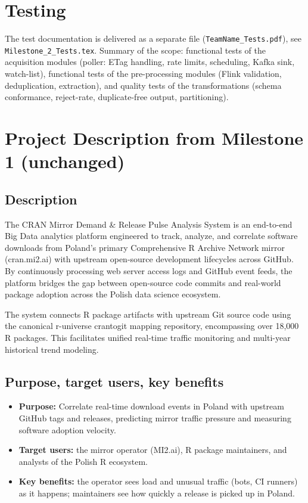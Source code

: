 \documentclass[11pt,a4paper]{article}
\newcommand{\teamname}{TeamName}
\begin{document}
\section{Testing}

The test documentation is delivered as a separate file (\texttt{\teamname\_\allowbreak{}Tests.pdf}), see \texttt{Milestone\_\allowbreak{}2\_\allowbreak{}Tests.tex}.
Summary of the scope: functional tests of the acquisition modules (poller: ETag handling, rate limits, scheduling,
Kafka sink, watch-list), functional tests of the pre-processing modules (Flink validation, deduplication, extraction), and quality tests of the
transformations (schema conformance, reject-rate, duplicate-free output, partitioning).

\section{Project Description from Milestone 1 (unchanged)}\label{sec:pm1}

\subsection{Description}
The CRAN Mirror Demand \& Release Pulse Analysis System is an end-to-end Big Data analytics platform engineered to track, analyze, and
correlate software downloads from Poland's primary Comprehensive R Archive Network mirror (cran.mi2.ai) with upstream open-source
development lifecycles across GitHub. By continuously processing web server access logs and GitHub event feeds, the platform bridges the gap
between open-source code commits and real-world package adoption across the Polish data science ecosystem.

The system connects R package artifacts with upstream Git source code using the canonical r-universe crantogit mapping repository,
encompassing over 18,000 R packages. This facilitates unified real-time traffic monitoring and multi-year historical trend modeling.

\subsection{Purpose, target users, key benefits}
\begin{itemize}
  \item \textbf{Purpose:} Correlate real-time download events in Poland with upstream GitHub tags and releases, predicting mirror traffic
        pressure and measuring software adoption velocity.
  \item \textbf{Target users:} the mirror operator (MI2.ai), R package maintainers, and analysts of the Polish R ecosystem.
  \item \textbf{Key benefits:} the operator sees load and unusual traffic (bots, CI runners) as it happens; maintainers see how quickly
        a release is picked up in Poland.
\end{itemize}
\end{document}

